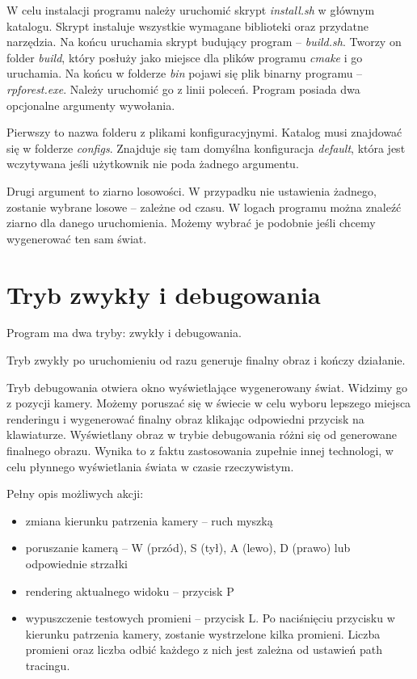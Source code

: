 \documentclass[inz,longabstract]{iithesis}
\begin{document}
        
        W celu instalacji programu należy uruchomić skrypt \textit{install.sh} w głównym katalogu. Skrypt instaluje wszystkie wymagane biblioteki oraz przydatne narzędzia. Na końcu uruchamia skrypt budujący program -- \textit{build.sh}. Tworzy on folder \textit{build}, który posłuży jako miejsce dla plików programu \textit{cmake} i go uruchamia. Na końcu w folderze \textit{bin} pojawi się plik binarny programu -- \textit{rpforest.exe}. Należy uruchomić go z linii poleceń. Program posiada dwa opcjonalne argumenty wywołania. 
        
        Pierwszy to nazwa folderu z plikami konfiguracyjnymi. Katalog musi znajdować się w folderze \textit{configs}. Znajduje się tam domyślna konfiguracja \textit{default}, która jest wczytywana jeśli użytkownik nie poda żadnego argumentu. 
        
        Drugi argument to ziarno losowości. W przypadku nie ustawienia żadnego, zostanie wybrane losowe -- zależne od czasu. W logach programu można znaleźć ziarno dla danego uruchomienia. Możemy wybrać je podobnie jeśli chcemy wygenerować ten sam świat. 
    
    \section{Tryb zwykły i debugowania}
        Program ma dwa tryby: zwykły i debugowania. 
        
        Tryb zwykły po uruchomieniu od razu generuje finalny obraz i kończy działanie. 
        
        Tryb debugowania otwiera okno wyświetlające wygenerowany świat. Widzimy go z pozycji kamery. Możemy poruszać się w świecie w celu wyboru lepszego miejsca renderingu i wygenerować finalny obraz klikając odpowiedni przycisk na klawiaturze. Wyświetlany obraz w trybie debugowania różni się od generowane finalnego obrazu. Wynika to z faktu zastosowania zupełnie innej technologi, w celu płynnego wyświetlania świata w czasie rzeczywistym.
        
        Pełny opis możliwych akcji:
        \begin{itemize}
            \item zmiana kierunku patrzenia kamery -- ruch myszką
            \item poruszanie kamerą -- W (przód), S (tył), A (lewo), D (prawo) lub odpowiednie strzałki
            \item rendering aktualnego widoku -- przycisk P
            \item wypuszczenie testowych promieni -- przycisk L. Po naciśnięciu przycisku w kierunku patrzenia kamery, zostanie wystrzelone kilka promieni. Liczba promieni oraz liczba odbić każdego z nich jest zależna od ustawień path tracingu.
        \end{itemize}
        
\end{document}
